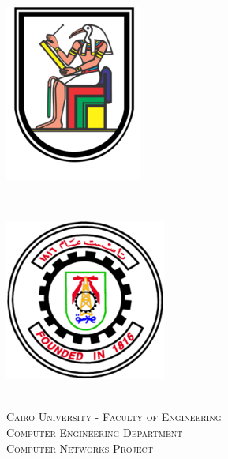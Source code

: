 \documentclass[a4paper,12pt]{article}
\begin{document}
\begin{titlepage}
\newcommand{\HRule}{\rule{\linewidth}{0.5mm}} %
\setlength{\topmargin}{0in}
\center %
 
 \begin{minipage}{0.4\textwidth}
\begin{flushleft} \large
\hspace*{-0.5cm}
\includegraphics[scale=4]{images/uni_logo.png}\\
\end{flushleft}
\end{minipage}
~
\begin{minipage}{0.5\textwidth}
\begin{flushright} \large
\hspace*{2cm}
\includegraphics[scale=0.6]{images/fac_logo.png}\\
\end{flushright}
\end{minipage}\\[1cm]

\textsc{\Large Cairo University - Faculty of Engineering}\\[0.5cm] %
\textsc{Computer Engineering Department} \\[0.5cm] 
\textsc{Computer Networks Project} \\[0.5cm] 
\textsc{\large }\\[0.5cm] %


\end{titlepage}
\end{document}
